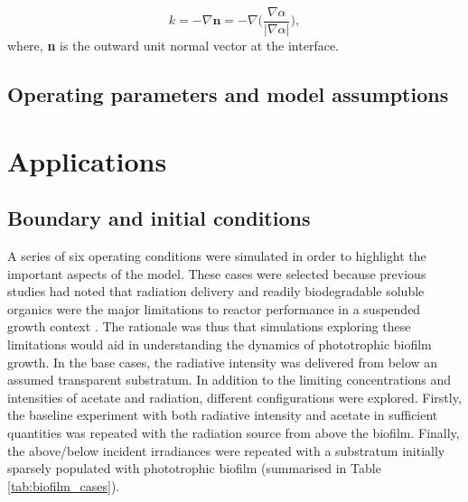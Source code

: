 \begin{equation}
    \label{eq:curvature}
    k = -\nabla \mathbf{n} = -\nabla \Bigg(\frac{\nabla \alpha}{\big| \nabla \alpha\big|} \Bigg),
\end{equation}
where, \textbf{n} is the outward unit normal vector at the interface.

\subsection{Operating parameters and model assumptions}


\section{Applications}
\subsection{Boundary and initial conditions}
A series of six operating conditions were simulated in order to highlight the important aspects of the model. These cases were selected because previous studies had noted that radiation delivery and readily biodegradable soluble organics were the major limitations to reactor performance in a suspended growth context \cite{hulsen2016, hulsen2016a}. The rationale was thus that simulations exploring these limitations would aid in understanding the dynamics of phototrophic biofilm growth. In the base cases, the radiative intensity was delivered from below an assumed transparent substratum. In addition to the limiting concentrations and intensities of acetate and radiation, different configurations were explored. Firstly, the baseline experiment with both radiative intensity and acetate in sufficient quantities was repeated with the radiation source from above the biofilm. Finally, the above/below incident irradiances were repeated with a substratum initially sparsely populated with phototrophic biofilm (summarised in Table \ref{tab:biofilm_cases}). 

